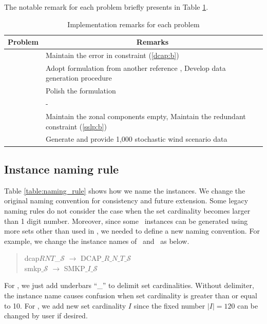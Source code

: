 The notable remark for each problem briefly presents in Table \ref{table:remarks}.

\begin{table}[]
	\centering
	\caption{Implementation remarks for each problem}
	\label{table:remarks}
	\begin{tabular}{@{}cl@{}}
		\toprule
		Problem & \multicolumn{1}{c}{Remarks}                                                \\ \midrule
		\dcap   & Maintain the error in constraint (\ref{dcap:b})                                              \\
		\mptsps & Adopt formulation from another reference \cite{journal:LSD1990}, Develop data generation procedure \\
		\sizes  & Polish the formulation                                                    \\
		\smkp   & -                                                                         \\
		\sslp   & Maintain the zonal components empty, Maintain the redundant constraint (\ref{sslp:b})                                     \\
		\suc    & Generate and provide 1,000 stochastic wind scenario data                                    \\ \bottomrule
	\end{tabular}
\end{table}

\subsection{Instance naming rule}
Table \ref{table:naming_rule} shows how we name the instances. We change the original naming convention for consistency and future extension. Some legacy naming rules do not consider the case when the set cardinality becomes larger than 1 digit number. Moreover, since some \siplibtwo\ instances can be generated using more sets other than used in \siplib, we needed to define a new naming convention. For example, we change the instance names of \dcap\ and \smkp\ as below.
\begin{quote}
	\centering dcap$RNT$\_$\mathcal{S}$ $\longrightarrow$ DCAP$\_R\_N\_T\_\mathcal{S}$\\
	smkp$\_\mathcal{S}$ $\longrightarrow$ SMKP$\_I\_\mathcal{S}$
\end{quote}
For \dcap, we just add underbars ``\_'' to delimit set cardinalities. Without delimiter, the instance name causes confusion when set cardinality is greater than or equal to 10. For \smkp, we add new set cardinality $I$ since the fixed number $|I|=120$ can be changed by user if desired.

